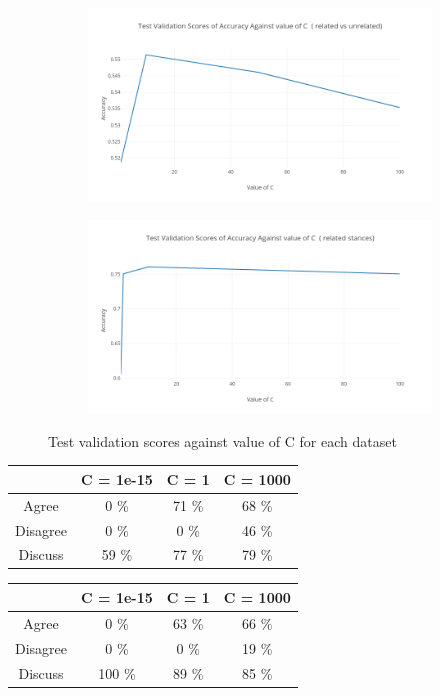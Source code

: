 \documentclass[11.5pt]{article}
\begin{document}
\begin{figure}[h!]
  \begin{subfigure}{.5\textwidth}
    \centering
    \includegraphics[width=.9\linewidth]{plot_1}
  \end{subfigure}
  \begin{subfigure}{.5\textwidth}
    \centering
    \includegraphics[width=.9\linewidth]{plot_2}
  \end{subfigure}
  \caption{Test validation scores against value of C for each dataset}
  \label{fig:logistic}
\end{figure}

\begin{table}[h!]
  \centering
  \begin{tabular} 
    {|c|c|c|c|}
    \hline
     & C = 1e-15 & C = 1 & C = 1000 \\
    \hline
    Agree & 0 \% & 71 \% & 68 \% \\
    \hline
    Disagree & 0 \% & 0 \% & 46 \% \\
    \hline
    Discuss & 59 \% & 77 \% & 79 \% \\
    \hline
  \end{tabular}
  \begin{tabular} 
    {|c|c|c|c|}
    \hline
     & C = 1e-15 & C = 1 & C = 1000 \\
    \hline
    Agree & 0 \% & 63 \% & 66 \% \\
    \hline
    Disagree & 0 \% & 0 \% & 19 \% \\
    \hline
    Discuss & 100 \% & 89 \% & 85 \% \\
    \hline
  \end{tabular}
\end{table}
\end{document}
